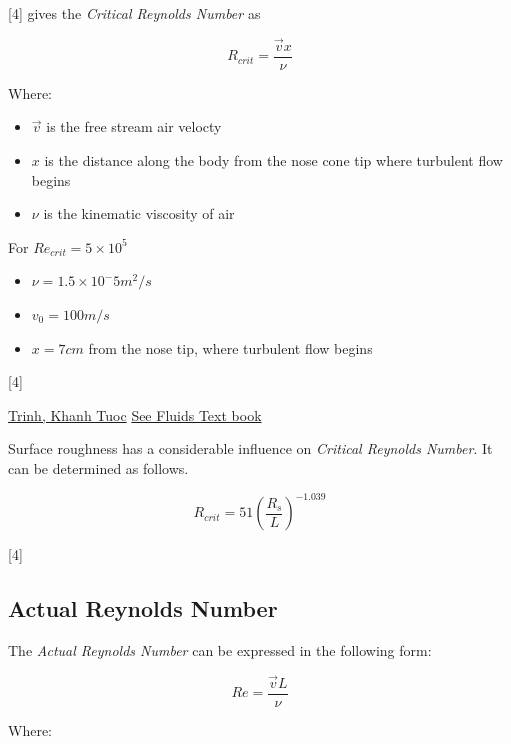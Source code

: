 \documentclass[]{book}
\providecommand{\tightlist}{%
  \setlength{\itemsep}{0pt}\setlength{\parskip}{0pt}}
\begin{document}
{[}4{]} gives the \emph{Critical Reynolds Number} as

\begin{equation}
\label{eq_reynolds_number_critical}
R_{crit} = \dfrac{\vec{v} x} {\nu}
\end{equation}

Where:

\begin{itemize}
\tightlist
\item
  \(\vec{v}\) is the free stream air velocty
\item
  \(x\) is the distance along the body from the nose cone tip where
  turbulent flow begins
\item
  \(\nu\) is the kinematic viscosity of air
\end{itemize}

For \(Re_{crit} = 5 \times 10^5\)

\begin{itemize}
\tightlist
\item
  \(\nu = 1.5 \times 10^-5 m^2/s\)
\item
  \(v_0 = 100 m/s\)
\item
  \(x = 7 cm\) from the nose tip, where turbulent flow begins
\end{itemize}

{[}4{]}

\href{http://arxiv.org/ftp/arxiv/papers/1007/1007.0810.pdf}{Trinh, Khanh
Tuoc} \href{fluids\%20textbook}{See Fluids Text book}

Surface roughness has a considerable influence on \emph{Critical
Reynolds Number}. It can be determined as follows.

\begin{equation}
\label{eq_reynolds_number_critical_roughness}
R_{crit} = 51 \left( \dfrac{R_s}{L} \right)^{-1.039}
\end{equation}

{[}4{]}

\subsection{Actual Reynolds Number}\label{actual-reynolds-number}

The \emph{Actual Reynolds Number} can be expressed in the following
form:

\begin{equation}
Re = \dfrac{\vec{v} L}{\nu} 
\end{equation}

Where:
\end{document}
